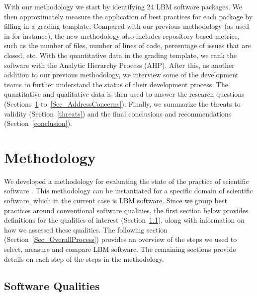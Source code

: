 \documentclass[final, 3p, times, authoryear]{elsarticle}
\begin{document}
With our methodology we start by identifying 24 LBM software packages.  We then
approximately measure the application of best practices for each package by
filling in a grading template. Compared with our previous methodology (as used
in \citep{SmithEtAl2016} for instance), the new methodology also includes
repository based metrics, such as the number of files, number of lines of code,
percentage of issues that are closed, etc.  With the quantitative data in the
grading template, we rank the software with the Analytic Hierarchy Process
(AHP). After this, as another addition to our previous methodology, we interview
some of the development teams to further understand the status of their
development process. The quantitative and qualitative data is then used to
answer the research questions (Sections~\ref{methodology}
to~\ref{Sec_AddressConcerns}).  Finally, we summarize the threats to validity
(Section~\ref{threats}) and the final conclusions and recommendations
(Section~\ref{conclusion}).

\section{Methodology} \label{methodology}

We developed a methodology for evaluating the state of the practice of
scientific software \citep{SmithEtAl2021}. This methodology can be instantiated
for a specific domain of scientific software, which in the current case is LBM
software.  Since we group best practices around conventional software qualities,
the first section below provides definitions for the qualities of interest
(Section~\ref{softwarequalities}), along with information on how we assessed
these qualities. The following section (Section~\ref{Sec_OverallProcess})
provides an overview of the steps we used to select, measure and compare LBM
software.  The remaining sections provide details on each step of the steps in
the methodology. 

\subsection{Software Qualities} \label{softwarequalities}
\end{document}
